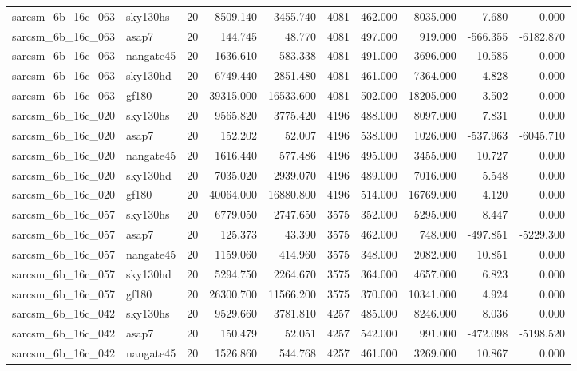 \begin{longtable}{llrrrrrrrr}
sarcsm\_6b\_16c\_063 & sky130hs & 20 & 8509.140 & 3455.740 & 4081 & 462.000 & 8035.000 & 7.680 & 0.000 \\
sarcsm\_6b\_16c\_063 & asap7 & 20 & 144.745 & 48.770 & 4081 & 497.000 & 919.000 & -566.355 & -6182.870 \\
sarcsm\_6b\_16c\_063 & nangate45 & 20 & 1636.610 & 583.338 & 4081 & 491.000 & 3696.000 & 10.585 & 0.000 \\
sarcsm\_6b\_16c\_063 & sky130hd & 20 & 6749.440 & 2851.480 & 4081 & 461.000 & 7364.000 & 4.828 & 0.000 \\
sarcsm\_6b\_16c\_063 & gf180 & 20 & 39315.000 & 16533.600 & 4081 & 502.000 & 18205.000 & 3.502 & 0.000 \\
sarcsm\_6b\_16c\_020 & sky130hs & 20 & 9565.820 & 3775.420 & 4196 & 488.000 & 8097.000 & 7.831 & 0.000 \\
sarcsm\_6b\_16c\_020 & asap7 & 20 & 152.202 & 52.007 & 4196 & 538.000 & 1026.000 & -537.963 & -6045.710 \\
sarcsm\_6b\_16c\_020 & nangate45 & 20 & 1616.440 & 577.486 & 4196 & 495.000 & 3455.000 & 10.727 & 0.000 \\
sarcsm\_6b\_16c\_020 & sky130hd & 20 & 7035.020 & 2939.070 & 4196 & 489.000 & 7016.000 & 5.548 & 0.000 \\
sarcsm\_6b\_16c\_020 & gf180 & 20 & 40064.000 & 16880.800 & 4196 & 514.000 & 16769.000 & 4.120 & 0.000 \\
sarcsm\_6b\_16c\_057 & sky130hs & 20 & 6779.050 & 2747.650 & 3575 & 352.000 & 5295.000 & 8.447 & 0.000 \\
sarcsm\_6b\_16c\_057 & asap7 & 20 & 125.373 & 43.390 & 3575 & 462.000 & 748.000 & -497.851 & -5229.300 \\
sarcsm\_6b\_16c\_057 & nangate45 & 20 & 1159.060 & 414.960 & 3575 & 348.000 & 2082.000 & 10.851 & 0.000 \\
sarcsm\_6b\_16c\_057 & sky130hd & 20 & 5294.750 & 2264.670 & 3575 & 364.000 & 4657.000 & 6.823 & 0.000 \\
sarcsm\_6b\_16c\_057 & gf180 & 20 & 26300.700 & 11566.200 & 3575 & 370.000 & 10341.000 & 4.924 & 0.000 \\
sarcsm\_6b\_16c\_042 & sky130hs & 20 & 9529.660 & 3781.810 & 4257 & 485.000 & 8246.000 & 8.036 & 0.000 \\
sarcsm\_6b\_16c\_042 & asap7 & 20 & 150.479 & 52.051 & 4257 & 542.000 & 991.000 & -472.098 & -5198.520 \\
sarcsm\_6b\_16c\_042 & nangate45 & 20 & 1526.860 & 544.768 & 4257 & 461.000 & 3269.000 & 10.867 & 0.000 \\

\end{longtable}
